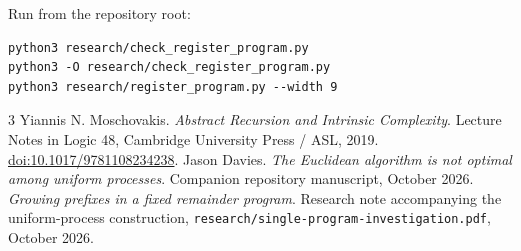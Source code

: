 \documentclass[11pt]{article}
\begin{document}
Run from the repository root:
\begin{verbatim}
python3 research/check_register_program.py
python3 -O research/check_register_program.py
python3 research/register_program.py --width 9
\end{verbatim}

\begin{thebibliography}{3}
Yiannis N. Moschovakis.
\emph{Abstract Recursion and Intrinsic Complexity}.
Lecture Notes in Logic 48, Cambridge University Press / ASL, 2019.
\href{https://doi.org/10.1017/9781108234238}{doi:10.1017/9781108234238}.
Jason Davies.
\emph{The Euclidean algorithm is not optimal among uniform processes}.
Companion repository manuscript, October 2026.
\emph{Growing prefixes in a fixed remainder program}.
Research note accompanying the uniform-process construction,
\texttt{research/single-program-investigation.pdf}, October 2026.
\end{thebibliography}
\end{document}
